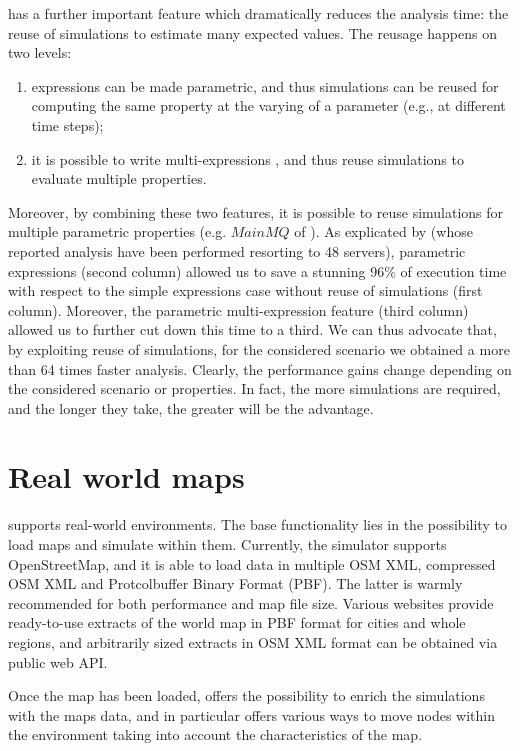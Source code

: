 \documentclass[12pt,a4paper,twoside,openright]{book}
\begin{document}
\multivesta{} has a further important feature which dramatically reduces the analysis time: the reuse of simulations to estimate many expected values. 
%
The reusage happens on two levels:
\begin{enumerate}
 \item expressions can be made parametric, and thus simulations can be reused for computing the same property at the varying of a parameter (e.g., at different time steps);
 \item it is possible to write multi-expressions , and thus reuse simulations to evaluate multiple properties.
\end{enumerate}
%
Moreover,  by combining these two features, it is possible to reuse simulations for multiple parametric properties (e.g. $MainMQ$ of ).
%
As explicated by  (whose reported analysis have been performed resorting to 48 servers), 	parametric expressions (second column) allowed us to save a stunning {%
96}\% of execution time with respect to the simple expressions case without reuse of simulations (first column). Moreover, the parametric multi-expression feature (third column) allowed us to further cut down this time to a third.
%
We can thus advocate that, by exploiting reuse of simulations, for the considered scenario we obtained a more than 64 times faster analysis.
%
Clearly, the performance gains change depending on the considered scenario or properties. In fact, the more simulations are required, and the longer they take, the greater will be the advantage.

\section{Real world maps}
\label{real-world-maps}
\alchemist{} supports real-world environments.
%
The base functionality lies in the possibility to load maps and simulate within them.
%
Currently, the simulator supports OpenStreetMap\cite{osm}, and it is able to load data in multiple OSM XML, compressed OSM XML and Protcolbuffer Binary Format (PBF).
%
The latter is warmly recommended for both performance and map file size.
%
Various websites provide ready-to-use extracts of the world map in PBF format for cities and whole regions, and arbitrarily sized extracts in OSM XML format can be obtained via public web API.

Once the map has been loaded, \alchemist{} offers the possibility to enrich the simulations with the maps data, and in particular offers various ways to move nodes within the environment taking into account the characteristics of the map.
\end{document}
